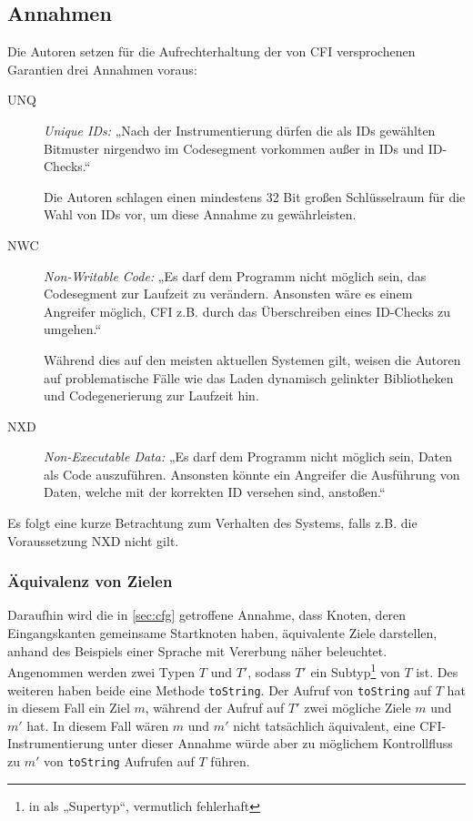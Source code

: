 \documentclass[11pt]{article}
\begin{document}
\subsection{Annahmen}


Die Autoren setzen für die Aufrechterhaltung der von CFI versprochenen
Garantien drei Annahmen voraus:

\begin{description}

  \item [UNQ] \emph{Unique IDs:} „Nach der Instrumentierung dürfen die als IDs
  gewählten Bitmuster nirgendwo im Codesegment vorkommen außer in IDs und
  ID-Checks.“

  Die Autoren schlagen einen mindestens 32 Bit großen Schlüsselraum für die
  Wahl von IDs vor, um diese Annahme zu gewährleisten.

  \item [NWC] \emph{Non-Writable Code:} „Es darf dem Programm nicht möglich
  sein, das Codesegment zur Laufzeit zu verändern. Ansonsten wäre es einem
  Angreifer möglich, CFI z.B. durch das Überschreiben eines ID-Checks zu
  umgehen.“

  Während dies auf den meisten aktuellen Systemen gilt, weisen die Autoren auf
  problematische Fälle wie das Laden dynamisch gelinkter Bibliotheken und
  Codegenerierung zur Laufzeit hin.

  \item [NXD] \emph{Non-Executable Data:} „Es darf dem Programm nicht möglich
  sein, Daten als Code auszuführen. Ansonsten könnte ein Angreifer die
  Ausführung von Daten, welche mit der korrekten ID versehen sind, anstoßen.“

\end{description}

Es folgt eine kurze Betrachtung zum Verhalten des Systems, falls z.B. die
Voraussetzung NXD nicht gilt.


\subsubsection{Äquivalenz von Zielen}

Daraufhin wird die in \ref{sec:cfg} getroffene Annahme, dass Knoten, deren
Eingangskanten gemeinsame Startknoten haben, äquivalente Ziele darstellen,
anhand des Beispiels einer Sprache mit Vererbung näher beleuchtet. Angenommen
werden zwei Typen $ T $ und $ T' $, sodass $ T' $ ein Subtyp\footnote{in
\cite{abadi-2005-control-msr} als „Supertyp“, vermutlich fehlerhaft} von
$ T $ ist.  Des weiteren haben beide eine Methode \texttt{toString}. Der Aufruf
von \texttt{toString} auf $ T $ hat in diesem Fall ein Ziel $ m $, während der
Aufruf auf $ T' $ zwei mögliche Ziele $ m $ und $ m' $ hat. In diesem Fall
wären $ m $ und $ m' $ nicht tatsächlich äquivalent, eine CFI-Instrumentierung
unter dieser Annahme würde aber zu möglichem Kontrollfluss zu $ m' $ von
\texttt{toString} Aufrufen auf $ T $ führen.
\end{document}
